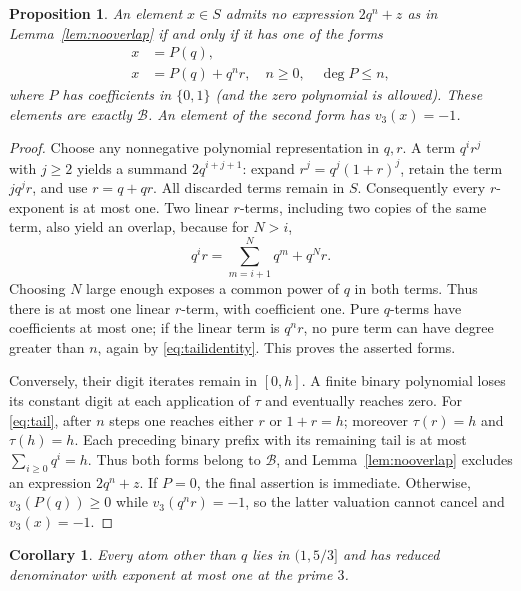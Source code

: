 \documentclass[11pt]{article}
\newtheorem{proposition}[theorem]{Proposition}
\newtheorem{corollary}[theorem]{Corollary}
\theoremstyle{definition}
\begin{document}
\begin{proposition}\label{prop:forms}
An element $x\in S$ admits no expression $2q^n+z$ as in
Lemma~\ref{lem:nooverlap} if and only if it has one of the forms
\begin{align}
 x&=P(q),\label{eq:finite}\\
 x&=P(q)+q^nr,\quad n\ge0,\quad\deg P\le n,\label{eq:tail}
\end{align}
where $P$ has coefficients in $\{0,1\}$ (and the zero polynomial is
allowed). These elements are exactly $\mathcal B$.
An element of the second form has $v_3(x)=-1$.
\end{proposition}
\begin{proof}
Choose any nonnegative polynomial representation in $q,r$.
A term $q^ir^j$ with $j\ge2$ yields a summand $2q^{i+j+1}$:
expand $r^j=q^j(1+r)^j$, retain the term $j q^jr$, and use
$r=q+qr$. All discarded terms remain in $S$.
Consequently every $r$-exponent is at most one.
Two linear $r$-terms, including two copies of the same term,
also yield an overlap, because for $N>i$,
\begin{equation}\label{eq:tailidentity}
 q^ir=\sum_{m=i+1}^{N}q^m+q^Nr.
\end{equation}
Choosing $N$ large enough exposes a common power of $q$ in both terms.
Thus there is at most one linear $r$-term, with coefficient one.
Pure $q$-terms have coefficients at most one; if the linear term is
$q^nr$, no pure term can have degree greater than $n$, again by
\eqref{eq:tailidentity}. This proves the asserted forms.

Conversely, their digit iterates remain in $[0,h]$. A finite binary
polynomial loses its constant digit at each application of $\tau$
and eventually reaches zero. For \eqref{eq:tail}, after $n$ steps
one reaches either $r$ or $1+r=h$; moreover $\tau(r)=h$ and
$\tau(h)=h$. Each preceding binary prefix with its remaining tail
is at most $\sum_{i\ge0}q^i=h$. Thus both forms belong to
$\mathcal B$, and Lemma~\ref{lem:nooverlap} excludes an expression
$2q^n+z$.
If $P=0$, the final assertion is immediate. Otherwise,
$v_3(P(q))\ge0$ while $v_3(q^nr)=-1$, so the latter valuation
cannot cancel and $v_3(x)=-1$.
\end{proof}

\begin{corollary}\label{cor:denominator}
Every atom other than $q$ lies in $(1,5/3]$ and has reduced denominator
with exponent at most one at the prime $3$.
\end{corollary}
\end{document}
